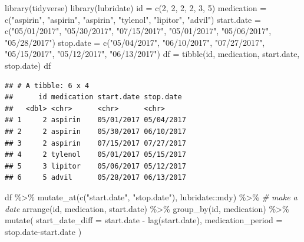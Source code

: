 \documentclass[
]{book}
\newenvironment{Shaded}{\begin{snugshade}}{\end{snugshade}}
\newcommand{\AttributeTok}[1]{\textcolor[rgb]{0.77,0.63,0.00}{#1}}
\newcommand{\CommentTok}[1]{\textcolor[rgb]{0.56,0.35,0.01}{\textit{#1}}}
\newcommand{\DecValTok}[1]{\textcolor[rgb]{0.00,0.00,0.81}{#1}}
\newcommand{\FunctionTok}[1]{\textcolor[rgb]{0.00,0.00,0.00}{#1}}
\newcommand{\NormalTok}[1]{#1}
\newcommand{\OtherTok}[1]{\textcolor[rgb]{0.56,0.35,0.01}{#1}}
\newcommand{\SpecialCharTok}[1]{\textcolor[rgb]{0.00,0.00,0.00}{#1}}
\newcommand{\StringTok}[1]{\textcolor[rgb]{0.31,0.60,0.02}{#1}}
\begin{document}
\begin{Shaded}
\begin{Highlighting}[]
\FunctionTok{library}\NormalTok{(tidyverse)}
\FunctionTok{library}\NormalTok{(lubridate)}
\NormalTok{id }\OtherTok{=} \FunctionTok{c}\NormalTok{(}\DecValTok{2}\NormalTok{, }\DecValTok{2}\NormalTok{, }\DecValTok{2}\NormalTok{, }\DecValTok{2}\NormalTok{, }\DecValTok{3}\NormalTok{, }\DecValTok{5}\NormalTok{) }
\NormalTok{medication }\OtherTok{=} \FunctionTok{c}\NormalTok{(}\StringTok{"aspirin"}\NormalTok{, }\StringTok{"aspirin"}\NormalTok{, }\StringTok{"aspirin"}\NormalTok{, }\StringTok{"tylenol"}\NormalTok{, }\StringTok{"lipitor"}\NormalTok{, }\StringTok{"advil"}\NormalTok{) }
\NormalTok{start.date }\OtherTok{=} \FunctionTok{c}\NormalTok{(}\StringTok{"05/01/2017"}\NormalTok{, }\StringTok{"05/30/2017"}\NormalTok{, }\StringTok{"07/15/2017"}\NormalTok{, }\StringTok{"05/01/2017"}\NormalTok{, }\StringTok{"05/06/2017"}\NormalTok{, }\StringTok{"05/28/2017"}\NormalTok{)}
\NormalTok{stop.date }\OtherTok{=} \FunctionTok{c}\NormalTok{(}\StringTok{"05/04/2017"}\NormalTok{, }\StringTok{"06/10/2017"}\NormalTok{, }\StringTok{"07/27/2017"}\NormalTok{, }\StringTok{"05/15/2017"}\NormalTok{, }\StringTok{"05/12/2017"}\NormalTok{, }\StringTok{"06/13/2017"}\NormalTok{)}
\NormalTok{df }\OtherTok{=} \FunctionTok{tibble}\NormalTok{(id, medication, start.date, stop.date)}
\NormalTok{df}
\end{Highlighting}
\end{Shaded}

\begin{verbatim}
## # A tibble: 6 x 4
##      id medication start.date stop.date 
##   <dbl> <chr>      <chr>      <chr>     
## 1     2 aspirin    05/01/2017 05/04/2017
## 2     2 aspirin    05/30/2017 06/10/2017
## 3     2 aspirin    07/15/2017 07/27/2017
## 4     2 tylenol    05/01/2017 05/15/2017
## 5     3 lipitor    05/06/2017 05/12/2017
## 6     5 advil      05/28/2017 06/13/2017
\end{verbatim}

\begin{Shaded}
\begin{Highlighting}[]
\NormalTok{df }\SpecialCharTok{\%\textgreater{}\%}
  \FunctionTok{mutate\_at}\NormalTok{(}\FunctionTok{c}\NormalTok{(}\StringTok{"start.date"}\NormalTok{, }\StringTok{"stop.date"}\NormalTok{), lubridate}\SpecialCharTok{::}\NormalTok{mdy) }\SpecialCharTok{\%\textgreater{}\%} \CommentTok{\# make a date}
  \FunctionTok{arrange}\NormalTok{(id, medication, start.date) }\SpecialCharTok{\%\textgreater{}\%} 
  \FunctionTok{group\_by}\NormalTok{(id, medication) }\SpecialCharTok{\%\textgreater{}\%} 
  \FunctionTok{mutate}\NormalTok{(}
    \AttributeTok{start\_date\_diff =}\NormalTok{ start.date }\SpecialCharTok{{-}} \FunctionTok{lag}\NormalTok{(start.date),}
    \AttributeTok{medication\_period =}\NormalTok{ stop.date}\SpecialCharTok{{-}}\NormalTok{start.date}
\NormalTok{  )}
\end{Highlighting}
\end{Shaded}
\end{document}
